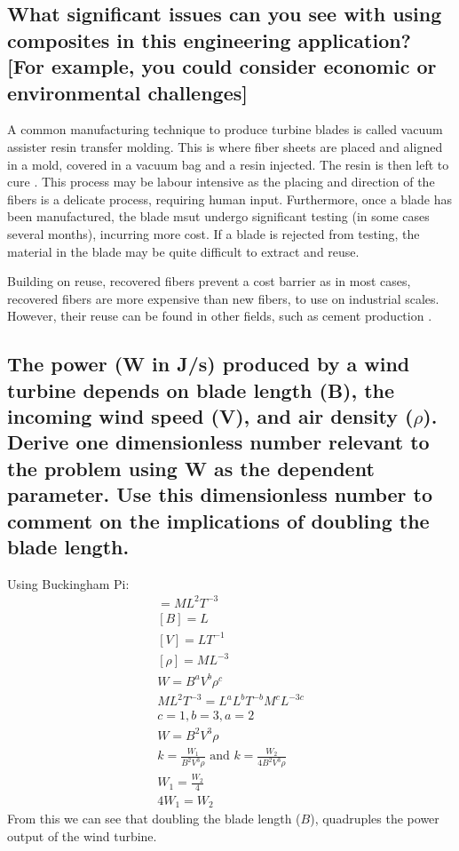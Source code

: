 \documentclass[12pt]{article}
\begin{document}
\begin{flushleft}
\subsection{What significant issues can you see with using composites in this engineering application? [For 
example, you could consider economic or environmental
challenges]}
A common manufacturing technique to produce turbine blades is called vacuum assister resin transfer molding. This is where fiber sheets are placed and aligned in a mold, covered in a vacuum bag and a resin injected. The resin is then left to cure \citep{VARTM}. This process may be labour intensive as the placing and direction of the fibers is a delicate process, requiring human input. Furthermore, once a blade has been manufactured, the blade msut undergo significant testing (in some cases several months), incurring more cost. If a blade is rejected from testing, the material in the blade may be quite difficult to extract and reuse. 

Building on reuse, recovered fibers prevent a cost barrier as in most cases, recovered fibers are more expensive than new fibers, to use on industrial scales. However, their reuse can be found in other fields, such as cement production \citep{fiberCement}.

\subsection{The power (W in J/s) produced by a wind turbine depends on blade length (B), the incoming wind speed (V), and air density (\(\rho\)). Derive one dimensionless number relevant to the problem using W as the dependent parameter. Use this dimensionless number to comment on the implications of doubling the blade length.}
Using Buckingham Pi:
\begin{gather}
  [W] = ML^2T^{-3}\\
  [B] = L\\
  [V] = LT^{-1}\\
  [\rho] = ML^{-3}\\
  W = B^a V^b \rho^c\\
  ML^2T^{-3} = L^a L^b T^{-b} M^c L^{-3c}\\
  c = 1, b = 3, a = 2\\
  W = B^2 V^3 \rho \\
  k = \frac{W_1}{B^2 V^3 \rho} \textrm{ and } k = \frac{W_2}{4B^2 V^3 \rho}\\
  W_1 = \frac{W_2}{4} \\
  4W_1 = W_2
\end{gather}
From this we can see that doubling the blade length (\(B\)), quadruples the power output of the wind turbine.


\end{flushleft}
\end{document}
